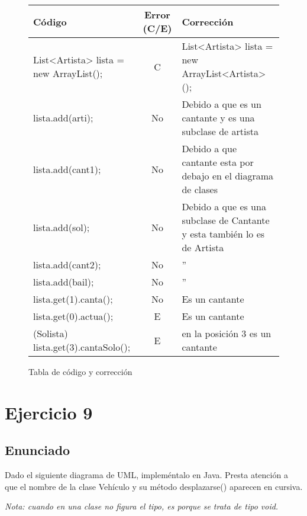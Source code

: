 \documentclass[a4paper,12pt]{article}
\begin{document}
    \begin{figure}[H]
        \centering
        \begin{tabular}{|l|c|p{5cm}|}
        \hline
        \textbf{Código} & \textbf{Error (C/E)} & \textbf{Corrección} \\ \hline
        List<Artista> lista = new ArrayList(); & C & List<Artista> lista = new ArrayList<Artista>(); \\ \hline
        lista.add(arti); & No & Debido a que es un cantante y es una subclase de artista \\ \hline
        lista.add(cant1); & No & Debido a que cantante esta por debajo en el diagrama de clases \\ \hline
        lista.add(sol); & No & Debido a que es una subclase de Cantante y esta también lo es de Artista \\ \hline
        lista.add(cant2); & No & '' \\ \hline
        lista.add(bail); & No & '' \\ \hline
        lista.get(1).canta(); & No & Es un cantante \\ \hline
        lista.get(0).actua(); & E & Es un cantante \\ \hline
        (Solista) lista.get(3).cantaSolo(); & E & en la posición 3 es un cantante \\ \hline
        \end{tabular}
        \caption{Tabla de código y corrección}
    \end{figure}



    

\section{Ejercicio 9}

\subsection{Enunciado}

Dado el siguiente diagrama de UML, impleméntalo en Java. Presta atención a que el
nombre de la clase Vehículo y su método desplazarse() aparecen en cursiva.

\begin{tcolorbox}[colback=gray!5!white,colframe=gray!75!black]
    \textit{Nota: cuando en una clase no figura el tipo, es porque se trata de tipo void.}
\end{tcolorbox}
\end{document}
